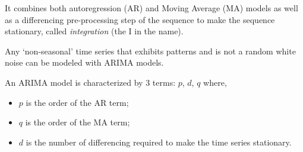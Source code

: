 It combines both autoregression (AR) and Moving Average (MA) models as
well as a differencing pre-processing step of the sequence to make the
sequence stationary, called \emph{integration} (the I in the name).

Any `non-seasonal' time series that exhibits patterns and is not a
random white noise can be modeled with ARIMA models.

An ARIMA model is characterized by 3 terms: \(p\), \(d\), \(q\) where,

\begin{itemize}
\tightlist
\item
  \(p\) is the order of the AR term;
\item
  \(q\) is the order of the MA term;
\item
  \(d\) is the number of differencing required to make the time series
  stationary.
\end{itemize}

